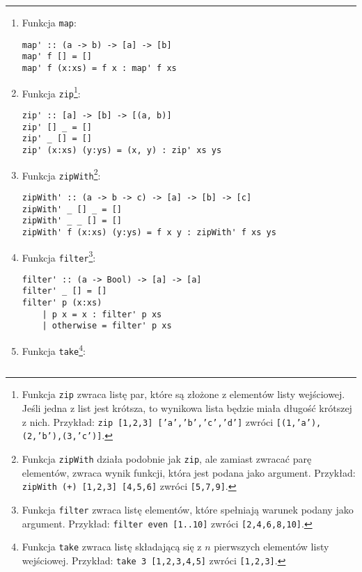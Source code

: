 \documentclass[11pt,a4paper]{article}
\begin{document}
\bigskip
\hrule
\bigskip

\begin{enumerate}
    \item Funkcja \texttt{map}:
        \begin{Verbatim}[frame=single]
map' :: (a -> b) -> [a] -> [b]
map' f [] = []
map' f (x:xs) = f x : map' f xs
        \end{Verbatim}
    \item Funkcja \texttt{zip}\footnote{Funkcja \texttt{zip} zwraca listę par, które są złożone z elementów listy wejściowej.
        Jeśli jedna z list jest krótsza, to wynikowa lista będzie miała długość krótszej z nich. \newline
    Przykład: \texttt{zip [1,2,3] ['a','b','c','d']} zwróci \texttt{[(1,'a'),(2,'b'),(3,'c')]}.}:
        \begin{Verbatim}[frame=single]
zip' :: [a] -> [b] -> [(a, b)]
zip' [] _ = []
zip' _ [] = []
zip' (x:xs) (y:ys) = (x, y) : zip' xs ys
        \end{Verbatim}
    \item Funkcja \texttt{zipWith}\footnote{Funkcja \texttt{zipWith} działa podobnie jak \texttt{zip}, ale zamiast zwracać parę elementów, zwraca wynik funkcji, która jest podana jako argument. \newline
        Przykład: \texttt{zipWith (+) [1,2,3] [4,5,6]} zwróci \texttt{[5,7,9]}.}:
        \begin{Verbatim}[frame=single]
zipWith' :: (a -> b -> c) -> [a] -> [b] -> [c]
zipWith' _ [] _ = []
zipWith' _ _ [] = []
zipWith' f (x:xs) (y:ys) = f x y : zipWith' f xs ys
        \end{Verbatim}
    \item Funkcja \texttt{filter}\footnote{Funkcja \texttt{filter} zwraca listę elementów, które spełniają warunek podany jako argument. \newline
        Przykład: \texttt{filter even [1..10]} zwróci \texttt{[2,4,6,8,10]}.}:
        \begin{Verbatim}[frame=single]
filter' :: (a -> Bool) -> [a] -> [a]
filter' _ [] = []
filter' p (x:xs)
    | p x = x : filter' p xs
    | otherwise = filter' p xs
        \end{Verbatim}
    \item Funkcja \texttt{take}\footnote{Funkcja \texttt{take} zwraca listę składającą się z \( n \) pierwszych elementów listy wejściowej. \newline
        Przykład: \texttt{take 3 [1,2,3,4,5]} zwróci \texttt{[1,2,3]}.}:
        \begin{Verbatim}[frame=single]

\end{Verbatim}
\end{enumerate}
\end{document}
